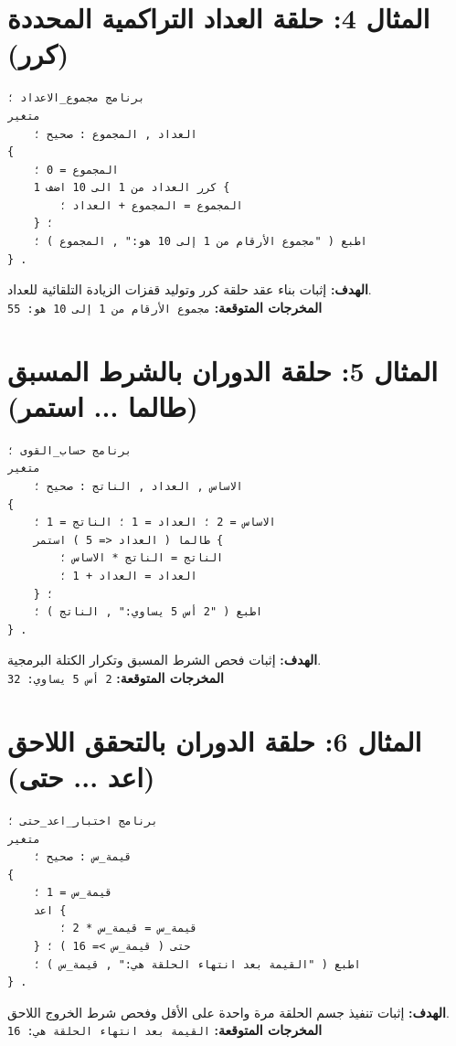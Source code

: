 \documentclass[11pt,a4paper,oneside]{report}
\begin{document}
\section{المثال 4: حلقة العداد التراكمية المحددة (كرر)}
\begin{tcolorbox}[colback=BgLight,colframe=BorderGray]
\begin{lstlisting}
برنامج مجموع_الاعداد ؛
متغير
    العداد , المجموع : صحيح ؛
{
    المجموع = 0 ؛
    كرر العداد من 1 الى 10 اضف 1 {
        المجموع = المجموع + العداد ؛
    } ؛
    اطبع ( "مجموع الأرقام من 1 إلى 10 هو:" , المجموع ) ؛
} .
\end{lstlisting}
\end{tcolorbox}
\textbf{الهدف:} إثبات بناء عقد حلقة كرر وتوليد قفزات الزيادة التلقائية للعداد.\\
\textbf{المخرجات المتوقعة:} \texttt{مجموع الأرقام من 1 إلى 10 هو: 55}

\section{المثال 5: حلقة الدوران بالشرط المسبق (طالما ... استمر)}
\begin{tcolorbox}[colback=BgLight,colframe=BorderGray]
\begin{lstlisting}
برنامج حساب_القوى ؛
متغير
    الاساس , العداد , الناتج : صحيح ؛
{
    الاساس = 2 ؛ العداد = 1 ؛ الناتج = 1 ؛
    طالما ( العداد <= 5 ) استمر {
        الناتج = الناتج * الاساس ؛
        العداد = العداد + 1 ؛
    } ؛
    اطبع ( "2 أس 5 يساوي:" , الناتج ) ؛
} .
\end{lstlisting}
\end{tcolorbox}
\textbf{الهدف:} إثبات فحص الشرط المسبق وتكرار الكتلة البرمجية.\\
\textbf{المخرجات المتوقعة:} \texttt{2 أس 5 يساوي: 32}

\section{المثال 6: حلقة الدوران بالتحقق اللاحق (اعد ... حتى)}
\begin{tcolorbox}[colback=BgLight,colframe=BorderGray]
\begin{lstlisting}
برنامج اختبار_اعد_حتى ؛
متغير
    قيمة_س : صحيح ؛
{
    قيمة_س = 1 ؛
    اعد {
        قيمة_س = قيمة_س * 2 ؛
    } حتى ( قيمة_س >= 16 ) ؛
    اطبع ( "القيمة بعد انتهاء الحلقة هي:" , قيمة_س ) ؛
} .
\end{lstlisting}
\end{tcolorbox}
\textbf{الهدف:} إثبات تنفيذ جسم الحلقة مرة واحدة على الأقل وفحص شرط الخروج اللاحق.\\
\textbf{المخرجات المتوقعة:} \texttt{القيمة بعد انتهاء الحلقة هي: 16}
\end{document}
